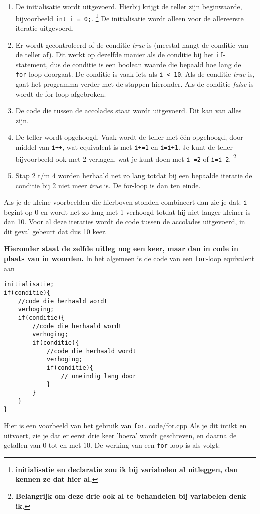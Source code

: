 \documentclass[12pt,a4paper]{article}
\newcommand{\code}{}
\newcommand{\icode}{\lstinline}
\begin{document}
\begin{enumerate}
	\item De initialisatie wordt uitgevoerd. Hierbij krijgt de teller zijn beginwaarde, bijvoorbeeld \icode{int i = 0;}. \footnote{\textbf{initialisatie en declaratie zou ik bij variabelen al uitleggen, dan kennen ze dat hier al.}} De initialisatie wordt alleen voor de allereerste iteratie uitgevoerd. 
	\item Er wordt gecontroleerd of de conditie \emph{true} is (meestal hangt de conditie van de teller af). Dit werkt op dezelfde manier als de conditie bij het \icode{if}-statement, dus de conditie is een boolean waarde die bepaald hoe lang de \icode{for}-loop doorgaat. De conditie is vaak iets als \icode{i < 10}. Als de conditie \emph{true} is, gaat het programma verder met de stappen hieronder. Als de conditie \emph{false} is wordt de for-loop afgebroken. 
	\item De code die tussen de accolades staat wordt uitgevoerd. Dit kan van alles zijn. 
	\item De teller wordt opgehoogd. Vaak wordt de teller met \'e\'en opgehoogd, door middel van \icode{i++}, wat equivalent is met \icode{i+=1} en \icode{i=i+1}. Je kunt de teller bijvoorbeeld ook met 2 verlagen, wat je kunt doen met \icode{i-=2} of \icode{i=i-2}. \footnote{\textbf{Belangrijk om deze drie ook al te behandelen bij variabelen denk ik.}}
	\item Stap 2 t/m 4 worden herhaald net zo lang totdat bij een bepaalde iteratie de conditie bij 2 niet meer \emph{true} is. De for-loop is dan ten einde. 
\end{enumerate}

Als je de kleine voorbeelden die hierboven stonden combineert dan zie je dat: \icode{i} begint op 0 en wordt net zo lang met 1 verhoogd totdat hij niet langer kleiner is dan 10. Voor al deze iteraties wordt de code tussen de accolades uitgevoerd, in dit geval gebeurt dat dus 10 keer. 

\textbf{Hieronder staat de zelfde uitleg nog een keer, maar dan in code in plaats van in woorden.} In het algemeen is de code van een \icode{for}-loop equivalent aan
\begin{lstlisting}
initialisatie;
if(conditie){
	//code die herhaald wordt
	verhoging;
	if(conditie){
		//code die herhaald wordt
		verhoging;
		if(conditie){
			//code die herhaald wordt
			verhoging;
			if(conditie){
				// oneindig lang door
			}
		}
	}
}
\end{lstlisting}
Hier is een voorbeeld van het gebruik van \icode{for}.
\code{code/for.cpp}
Als je dit intikt en uitvoert, zie je dat er eerst drie keer 'hoera' wordt geschreven, en daarna de getallen van $0$ tot en met $10$. De werking van een \icode{for}-loop is als volgt:\\
\end{document}
